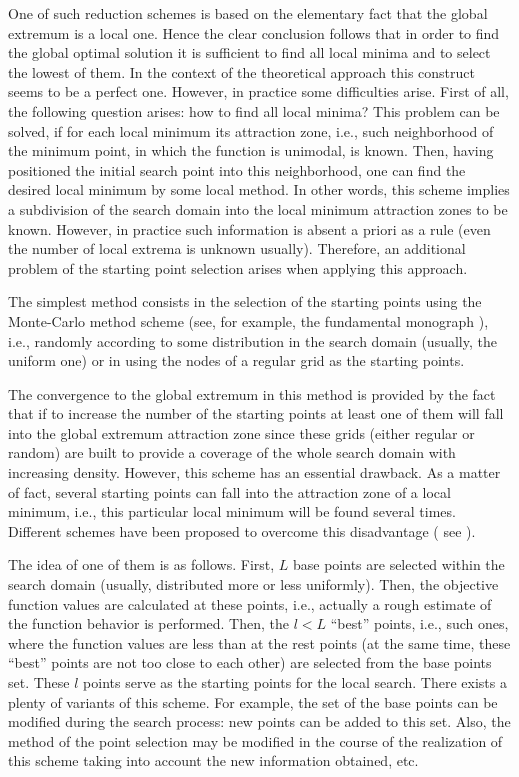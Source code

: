 One of such reduction schemes is based on the elementary fact that the global extremum is a local one. Hence the clear conclusion follows that in order to find the global optimal solution it is sufficient to find all local minima and to select the lowest of them. In the context of the theoretical approach this construct seems to be a perfect one. However, in practice some difficulties arise. 
First of all, the following question arises: how to find all local minima? This problem can be solved, if for each local minimum its attraction zone, i.e., such neighborhood of the minimum point, in which the function is unimodal, is known. Then, having positioned the initial search point into this neighborhood, one can find the desired local minimum by some local method. In other words, this scheme implies a subdivision of the search domain into the local minimum attraction zones to be known. However, in practice such information is absent a priori as a rule (even the number of local extrema is unknown usually). Therefore, an additional problem of the starting point selection arises when applying this approach. 

The simplest method consists in the selection of the starting points using the Monte-Carlo method scheme (see, for example, the fundamental monograph \cite{1_ZhigZhil}), i.e., randomly according to some distribution in the search domain (usually, the uniform one) or in using the nodes of a regular grid as the starting points.

The convergence to the global extremum in this method is provided by the fact that if to increase the number of the starting points at least one of them will fall into the global extremum attraction zone since these grids (either regular or random) are built to provide a coverage of the whole search domain with increasing density. However, this scheme has an essential drawback. As a matter of fact, several starting points can fall into the attraction zone of a local minimum, i.e., this particular local minimum will be found several times. Different schemes have been proposed to overcome this disadvantage ( see \cite{1_BetroSchoen, 1_BoendeRinnooy, 1_Zielinski}). 

The idea of one of them is as follows. First, $L$ base points are selected within the search domain (usually, distributed more or less uniformly). Then, the objective function values are calculated at these points, i.e., actually a rough estimate of the function behavior is performed. Then, the $l<L$  “best” points, i.e., such ones, where the function values are less than at the rest points (at the same time, these “best” points are not too close to each other) are selected from the base points set. These $l$ points serve as the starting points for the local search. There exists a plenty of variants of this scheme. For example, the set of the base points can be modified during the search process: new points can be added to this set. Also, the method of  the point selection may be modified in the course  of the realization of this scheme taking into account the new information obtained, etc. 

